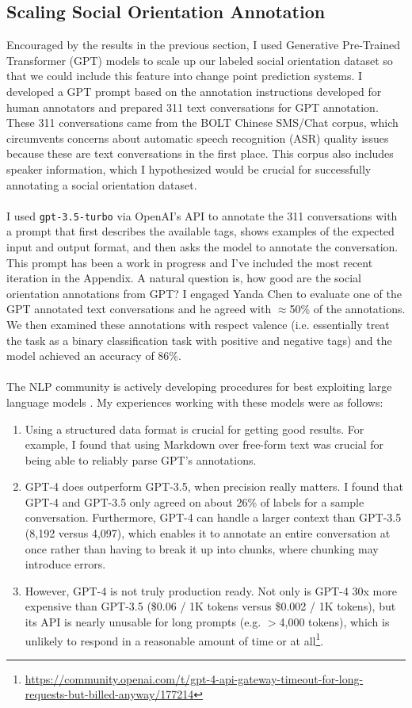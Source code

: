 \documentclass[12pt]{article}
\begin{document}
\subsection{Scaling Social Orientation Annotation}
Encouraged by the results in the previous section, I used Generative Pre-Trained Transformer (GPT) models to scale up our labeled social orientation dataset so that we could include this feature into change point prediction systems. I developed a GPT prompt based on the annotation instructions developed for human annotators and prepared 311 text conversations for GPT annotation. These 311 conversations came from the BOLT Chinese SMS/Chat \cite{BOLT} corpus, which circumvents concerns about automatic speech recognition (ASR) quality issues because these are text conversations in the first place. This corpus also includes speaker information, which I hypothesized would be crucial for successfully annotating a social orientation dataset.\\
\\
I used \verb|gpt-3.5-turbo| via OpenAI's API to annotate the 311 conversations with a prompt that first describes the available tags, shows examples of the expected input and output format, and then asks the model to annotate the conversation. This prompt has been a work in progress and I've included the most recent iteration in the Appendix. A natural question is, how good are the social orientation annotations from GPT? I engaged Yanda Chen to evaluate one of the GPT annotated text conversations and he agreed with $\approx$50\% of the annotations. We then examined these annotations with respect valence (i.e. essentially treat the task as a binary classification task with positive and negative tags) and the model achieved an accuracy of 86\%.\\
\\
The NLP community is actively developing procedures for best exploiting large language models \cite{chen2023frugalgpt}. My experiences working with these models were as follows:
\begin{enumerate}
    \item Using a structured data format is crucial for getting good results. For example, I found that using Markdown over free-form text was crucial for being able to reliably parse GPT's annotations.
    \item GPT-4 does outperform GPT-3.5, when precision really matters. I found that GPT-4 and GPT-3.5 only agreed on about 26\% of labels for a sample conversation. Furthermore, GPT-4 can handle a larger context than GPT-3.5 (8,192 versus 4,097), which enables it to annotate an entire conversation at once rather than having to break it up into chunks, where chunking may introduce errors.
    \item However, GPT-4 is not truly production ready. Not only is GPT-4 30x more expensive than GPT-3.5 (\$0.06 / 1K tokens versus \$0.002 / 1K tokens), but its API is nearly unusable for long prompts (e.g. $>$4,000 tokens), which is unlikely to respond in a reasonable amount of time or at all\footnote{\url{https://community.openai.com/t/gpt-4-api-gateway-timeout-for-long-requests-but-billed-anyway/177214}}.
\end{enumerate}
\end{document}

